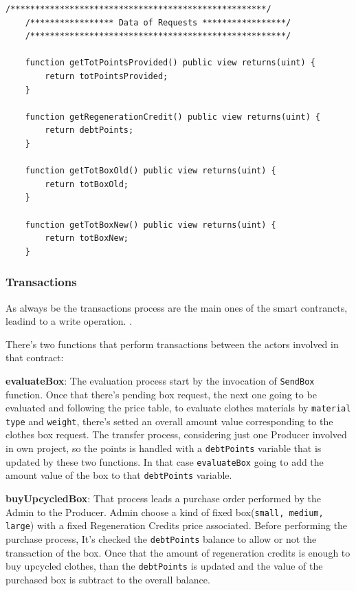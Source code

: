 \begin{lstlisting}[language=Solidity]
    /****************************************************/
    /***************** Data of Requests *****************/
    /****************************************************/

    function getTotPointsProvided() public view returns(uint) {
        return totPointsProvided;
    }

    function getRegenerationCredit() public view returns(uint) {
        return debtPoints;
    }

    function getTotBoxOld() public view returns(uint) {
        return totBoxOld;
    }

    function getTotBoxNew() public view returns(uint) {
        return totBoxNew;
    }

\end{lstlisting}

\subsubsection{Transactions}

As always be the transactions process are the main ones of the smart contrancts, leadind to a write
operation.
\bigskip.

There's two functions that perform transactions between the actors involved in that contract:

\begin{outline}[enumerate]
    \1 \textbf{evaluateBox}: The evaluation process start by the invocation of \texttt{SendBox} function.
    Once that there's pending box request, the next one going to be evaluated and following
    the price table, to evaluate clothes materials by \texttt{material type} and \texttt{weight},
    there's setted an overall amount value corresponding to the clothes box request.
    The transfer process, considering just one Producer involved in own project, so the points is 
    handled with a \texttt{debtPoints} variable that is updated by these two functions. In that
    case \texttt{evaluateBox} going to add the amount value of the box to that \texttt{debtPoints} variable. 

    \1 \textbf{buyUpcycledBox}: That process leads a purchase order performed by the Admin to the 
    Producer. Admin choose a kind of fixed box(\texttt{small, medium, large}) with a fixed Regeneration
    Credits price associated. Before performing the purchase process, It's checked the \texttt{debtPoints}
    balance to allow or not the transaction of the box. Once that the amount of regeneration credits
    is enough to buy upcycled clothes, than the \texttt{debtPoints} is updated and the value of the
    purchased box is subtract to the overall balance. 
\end{outline}

